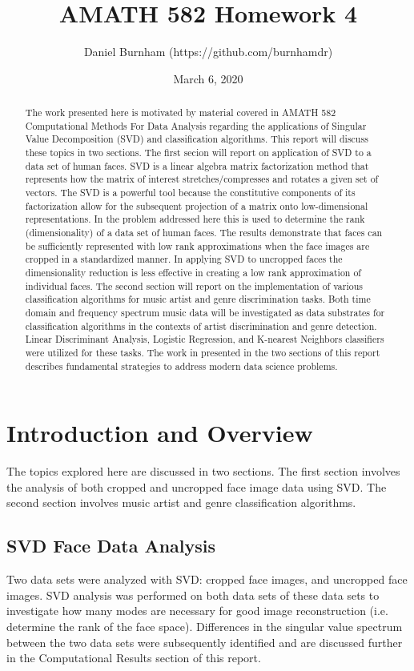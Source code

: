 \documentclass{article}
\title{AMATH 582 Homework 4}
\author{Daniel Burnham (https://github.com/burnhamdr)}
\date{March 6, 2020}
\begin{document}
\maketitle

\begin{abstract}
The work presented here is motivated by material covered in AMATH 582 Computational Methods For Data Analysis regarding the applications of Singular Value Decomposition (SVD) and classification algorithms. This report will discuss these topics in two sections. The first secion will report on application of SVD to a data set of human faces. SVD is a linear algebra matrix factorization method that represents how the matrix of interest stretches/compresses and rotates a given set of vectors. The SVD is a powerful tool because the constitutive components of its factorization allow for the subsequent projection of a matrix onto low-dimensional representations. In the problem addressed here this is used to determine the rank (dimensionality) of a data set of human faces. The results demonstrate that faces can be sufficiently represented with low rank approximations when the face images are cropped in a standardized manner. In applying SVD to uncropped faces the dimensionality reduction is less effective in creating a low rank approximation of individual faces. The second section will report on the implementation of various classification algorithms for music artist and genre discrimination tasks. Both time domain and frequency spectrum music data will be investigated as data substrates for classification algorithms in the contexts of artist discrimination and genre detection. Linear Discriminant Analysis, Logistic Regression, and K-nearest Neighbors classifiers were utilized for these tasks. The work in presented in the two sections of this report describes fundamental strategies to address modern data science problems.
\end{abstract}

\section{Introduction and Overview}
The topics explored here are discussed in two sections. The first section involves the analysis of both cropped and uncropped face image data using SVD. The second section involves music artist and genre classification algorithms.

\subsection{SVD Face Data Analysis}
Two data sets were analyzed with SVD: cropped face images, and uncropped face images. SVD analysis was performed on both data sets of these data sets to investigate how many modes are necessary for good image reconstruction (i.e. determine the rank of the face space). Differences in the singular value spectrum between the two data sets were subsequently identified and are discussed further in the Computational Results section of this report.
\end{document}
